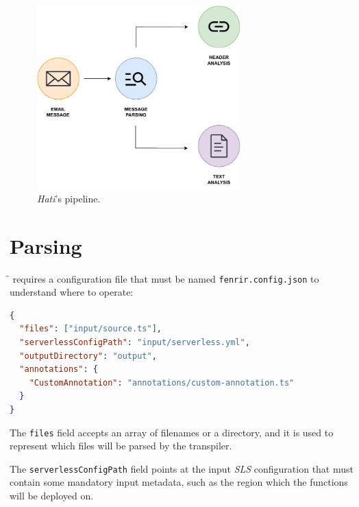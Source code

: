 \begin{figure}[H]
  \centering
  \includegraphics[width=0.7\textwidth]{diagrams/hati}
  \caption{\textit{Hati}'s pipeline.}
  \label{fig:hati}
\end{figure}



\section{Parsing}

\f{} requires a configuration file that must be named \verb|fenrir.config.json| to understand where to operate:

\begin{lstlisting}[language=json, caption={\f{} configuration}]
{
  "files": ["input/source.ts"],
  "serverlessConfigPath": "input/serverless.yml",
  "outputDirectory": "output",
  "annotations": {
    "CustomAnnotation": "annotations/custom-annotation.ts"
  }
}
\end{lstlisting}

The \verb|files| field accepts an array of filenames or a directory,
and it is used to represent which files will be parsed by the transpiler.

The \verb|serverlessConfigPath| field points at the input \textit{SLS} configuration
that must contain some mandatory input metadata, such as the region which the functions will be deployed on.

